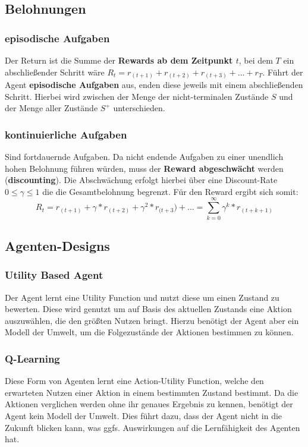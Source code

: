 \documentclass[10pt]{scrartcl}
\begin{document}
\subsection{Belohnungen}
\subsubsection{episodische Aufgaben}
Der Return ist die Summe der \textbf{Rewards ab dem Zeitpunkt $t$}, bei dem $T$ ein abschließender Schritt wäre  $R_{t}= r_{(t+1)}+ r_{(t+2)}+ r_{(t+3)}+ ... +r_{T}$. Führt der Agent \textbf{episodische Aufgaben} aus, enden diese jeweils mit einem abschließenden Schritt. Hierbei wird zwischen der Menge der nicht-terminalen Zustände $S$ und der Menge aller Zustände $S^{+}$ unterschieden.

\subsubsection{kontinuierliche Aufgaben}
Sind fortdauernde Aufgaben. Da nicht endende Aufgaben zu einer unendlich hohen Belohnung führen würden, muss der \textbf{Reward abgeschwächt} werden (\textbf{discounting}). Die Abschwächung erfolgt hierbei über eine Discount-Rate $0 \leq \gamma  \leq 1$ die die Gesamtbelohnung begrenzt. Für den Reward ergibt sich somit: 
\begin{equation}
R_{t}= r_{(t+1)}+ \gamma*r_{(t+2)}+ \gamma^2*r_{(t+3})+ ... = \sum_{k=0}^\infty \gamma^{k}* r_{(t+k+1)}
\end{equation}

\subsection{Agenten-Designs}
\subsubsection{Utility Based Agent}
Der Agent lernt eine \glqq Utility Function\grqq\xspace und nutzt diese um einen Zustand zu bewerten. Diese wird genutzt um auf Basis des aktuellen Zustands eine Aktion auszuwählen, die den größten Nutzen bringt. Hierzu benötigt der Agent aber ein Modell der Umwelt, um die Folgezustände der Aktionen bestimmen zu können.

\subsubsection{Q-Learning}
Diese Form von Agenten lernt eine \glqq Action-Utility Function\grqq\xspace, welche den erwarteten Nutzen einer Aktion in einem bestimmten Zustand bestimmt. Da die Aktionen verglichen werden ohne ihr genaues Ergebnis zu kennen, benötigt der Agent kein Modell der Umwelt. Dies führt dazu, dass der Agent nicht in die Zukunft blicken kann, was ggfs. Auswirkungen auf die Lernfähigkeit des Agenten hat.
\end{document}
